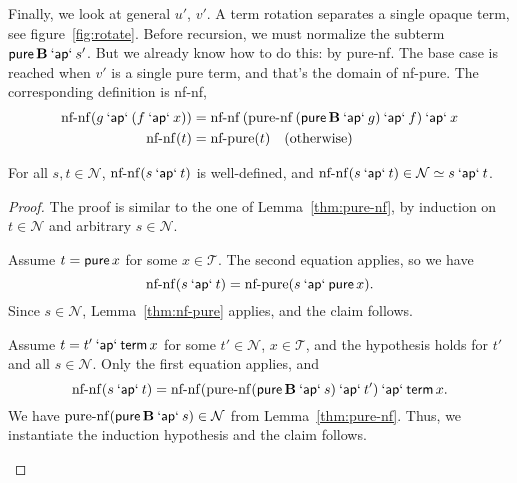 Finally, we look at general $u'$, $v'$.
A term rotation separates a single opaque term, see figure~\ref{fig:rotate}.
Before recursion, we must normalize the subterm $\operatorname{\mathsf{pure}} \mathbf{B} \mathbin{\mathsf{`ap`}} s'$.
But we already know how to do this: by pure-nf.
The base case is reached when $v'$ is a single pure term, and that's the domain
of nf-pure.
The corresponding definition is nf-nf,
\begin{align}
	\operatorname{nf-nf}(g \mathbin{\mathsf{`ap`}} (f \mathbin{\mathsf{`ap`}} x)) &=
		\operatorname{nf-nf}{(\operatorname{pure-nf}{(\operatorname{\mathsf{pure}} \mathbf{B} \mathbin{\mathsf{`ap`}} g)} \mathbin{\mathsf{`ap`}} f)} \mathbin{\mathsf{`ap`}} x \\
	\operatorname{nf-nf}(t) &= \operatorname{nf-pure}(t) \quad\text{(otherwise)}
\end{align}
\begin{lemma}\label{thm:nf-nf}
For all $s,t \in \mathcal{N}$, 
$\operatorname{nf-nf}(s \mathbin{\mathsf{`ap`}} t)$ is well-defined, and
$\operatorname{nf-nf}(s \mathbin{\mathsf{`ap`}} t) \in \mathcal{N} \simeq s \mathbin{\mathsf{`ap`}} t$.
\end{lemma}
\begin{proof}
The proof is similar to the one of Lemma~\ref{thm:pure-nf}, by induction on
$t \in \mathcal{N}$ and arbitrary $s \in \mathcal{N}$.
\begin{prfcases}
\item Assume $t = \operatorname{\mathsf{pure}} x$ for some $x \in \mathcal{T}$.
	The second equation applies, so we have
	\[ \operatorname{nf-nf}(s \mathbin{\mathsf{`ap`}} t) = \operatorname{nf-pure}(s \mathbin{\mathsf{`ap`}} \operatorname{\mathsf{pure}} x). \]
	Since $s \in \mathcal{N}$, Lemma~\ref{thm:nf-pure} applies, and the claim
	follows.
\item Assume $t = t' \mathbin{\mathsf{`ap`}} \operatorname{\mathsf{term}} x$ for some
	$t' \in \mathcal{N}$, $x \in \mathcal{T}$, and the hypothesis holds for $t'$
	and all $s \in \mathcal{N}$.
	Only the first equation applies, and
	\[ \operatorname{nf-nf}(s \mathbin{\mathsf{`ap`}} t) = \operatorname{nf-nf} (\operatorname{pure-nf}(\operatorname{\mathsf{pure}} \mathbf{B} \mathbin{\mathsf{`ap`}} s) \mathbin{\mathsf{`ap`}} t') \mathbin{\mathsf{`ap`}} \operatorname{\mathsf{term}} x. \]
	We have $\operatorname{pure-nf}(\operatorname{\mathsf{pure}} \mathbf{B} \mathbin{\mathsf{`ap`}} s) \in \mathcal{N}$
	from Lemma~\ref{thm:pure-nf}.
	Thus, we instantiate the induction hypothesis and the claim follows.
	\todo
\end{prfcases}
\end{proof}

